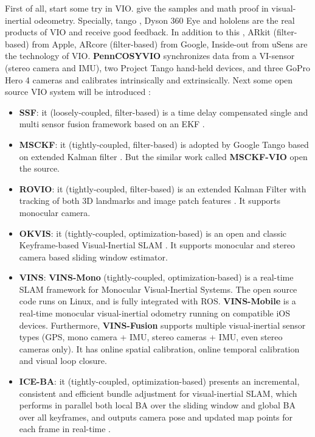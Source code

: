 \documentclass[journal,transmag]{IEEEtran}
\begin{document}
First of all, \cite{leutenegger2015keyframe}\cite{huang2014towards}\cite{li2013high} start some try in VIO. \cite{mur2017visual}\cite{forster2016manifold} give the samples and math proof in visual-inertial odeometry. Specially, tango \cite{froehlich2017investigation}, Dyson 360 Eye and hololens \cite{garon2016real} are the real products of VIO and receive good feedback. In addition to this
, ARkit (filter-based) from Apple, ARcore (filter-based) from Google, Inside-out from uSens are the technology of VIO. \textbf{PennCOSYVIO} \cite{pfrommer2017penncosyvio} synchronizes data from a VI-sensor (stereo camera and IMU), two Project Tango hand-held devices, and three GoPro Hero 4 cameras and calibrates intrinsically and extrinsically. Next some open source VIO system will be introduced \cite{delmerico2018benchmark}:
\begin{itemize}
    \item \textbf{SSF}: it (loosely-coupled, filter-based) is a time delay compensated single and multi sensor fusion framework based on an EKF \cite{weiss2012vision}.
    \item \textbf{MSCKF}: it (tightly-coupled, filter-based) is adopted by Google Tango based on extended Kalman filter \cite{mourikis2007multi}. But the similar work called \textbf{MSCKF-VIO} \cite{sun2018robust} open the source.
    \item \textbf{ROVIO}: it (tightly-coupled, filter-based) is an extended Kalman Filter with tracking of both 3D landmarks and image patch features \cite{bloesch2015robust}. It supports monocular camera.
    \item \textbf{OKVIS}: it (tightly-coupled, optimization-based) is an open and classic Keyframe-based Visual-Inertial SLAM \cite{leutenegger2015keyframe}. It supports monocular and stereo camera based sliding window estimator.
    \item \textbf{VINS}: \textbf{VINS-Mono} (tightly-coupled, optimization-based) \cite{li2017monocular}\cite{qin2018vins}\cite{qin2018online} is a real-time SLAM framework for Monocular Visual-Inertial Systems. The open source code runs on Linux, and is fully integrated with ROS.  \textbf{VINS-Mobile} \cite{qin2017robust}\cite{yang2016monocular} is a real-time monocular visual-inertial odometry running on compatible iOS devices. Furthermore, \textbf{VINS-Fusion} supports multiple visual-inertial sensor types (GPS, mono camera + IMU, stereo cameras + IMU, even stereo cameras only). It has online spatial calibration, online temporal calibration and visual loop closure.
    \item \textbf{ICE-BA}: it (tightly-coupled, optimization-based) presents an incremental, consistent and efficient bundle adjustment for visual-inertial SLAM, which  performs in parallel both local BA over the sliding window and global BA over all keyframes, and outputs camera pose and updated map points for each frame in real-time \cite{liu2018ice}.

\end{itemize}
\end{document}
